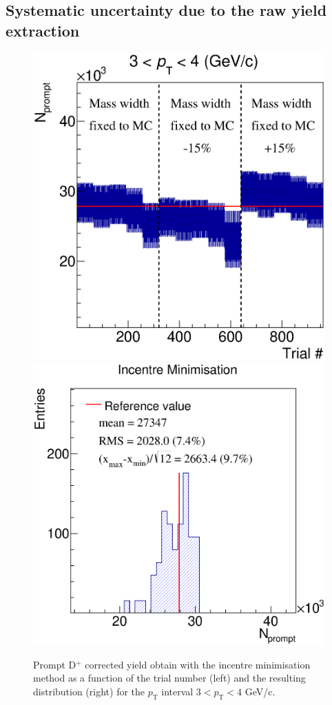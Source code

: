 \documentclass[b5paper,10pt,twoside,oldstyle,classica]{toptesi}
\newcommand{\pt}{p_\text{T}}
\begin{document}
\subsection{Systematic uncertainty due to the raw yield extraction}
\begin{figure}[b]
\begin{center}
{\includegraphics[scale = 0.3]{CorrYieldsVsTrialPromptInc_Pt1.eps}}
\hspace{-0.5cm}
{\includegraphics[scale = 0.3]{CorrYieldsDispPromptInc_Pt1.eps}}
\caption{Prompt D$^+$ corrected yield obtain with the incentre minimisation method as a function of the trial number (left) and the resulting distribution (right) for the $\pt$ interval $3<\pt<4$ GeV/c.}
\label{cutvar_prompt_massfits}
\end{center}
\end{figure}
\end{document}

